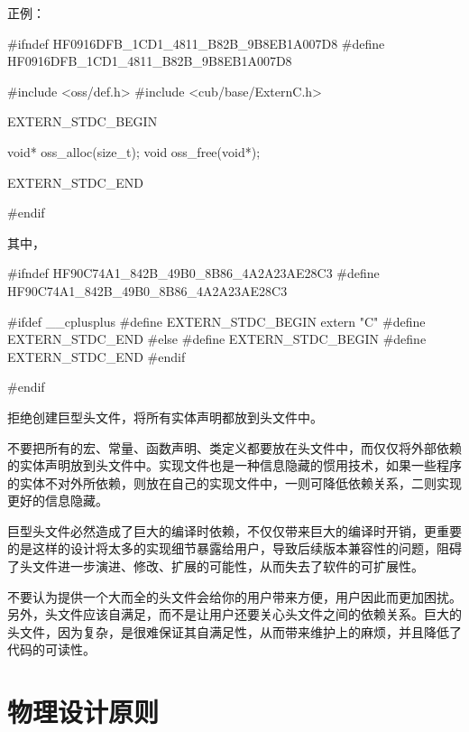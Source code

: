 \begin{content}
正例：
\begin{leftbar}
\begin{c++}[caption={\ttfamily{oss/oss\_memery.h}}]
#ifndef HF0916DFB_1CD1_4811_B82B_9B8EB1A007D8
#define HF0916DFB_1CD1_4811_B82B_9B8EB1A007D8
    
#include <oss/def.h>
#include <cub/base/ExternC.h>

EXTERN_STDC_BEGIN

void* oss_alloc(size_t);
void  oss_free(void*);

EXTERN_STDC_END

#endif
\end{c++}
\end{leftbar}

其中，

\begin{leftbar}
\begin{c++}[caption={\ttfamily{cub/base/ExternC.h}}]
#ifndef HF90C74A1_842B_49B0_8B86_4A2A23AE28C3
#define HF90C74A1_842B_49B0_8B86_4A2A23AE28C3

#ifdef __cplusplus
    #define EXTERN_STDC_BEGIN extern "C" {
    #define EXTERN_STDC_END  }
#else
    #define EXTERN_STDC_BEGIN
    #define EXTERN_STDC_END
#endif

#endif
\end{c++}
\end{leftbar}

\begin{advise}
拒绝创建巨型头文件，将所有实体声明都放到头文件中。
\end{advise}

不要把所有的宏、常量、函数声明、类定义都要放在头文件中，而仅仅将外部依赖的实体声明放到头文件中。实现文件也是一种信息隐藏的惯用技术，如果一些程序的实体不对外所依赖，则放在自己的实现文件中，一则可降低依赖关系，二则实现更好的信息隐藏。

巨型头文件必然造成了巨大的编译时依赖，不仅仅带来巨大的编译时开销，更重要的是这样的设计将太多的实现细节暴露给用户，导致后续版本兼容性的问题，阻碍了头文件进一步演进、修改、扩展的可能性，从而失去了软件的可扩展性。

不要认为提供一个大而全的头文件会给你的用户带来方便，用户因此而更加困扰。另外，头文件应该自满足，而不是让用户还要关心头文件之间的依赖关系。巨大的头文件，因为复杂，是很难保证其自满足性，从而带来维护上的麻烦，并且降低了代码的可读性。

\end{content}

\section{物理设计原则}

